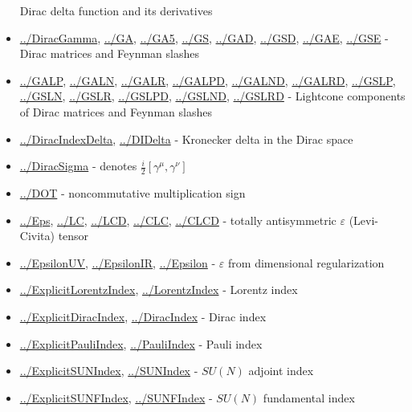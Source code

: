 \documentclass[../FeynCalcManual.tex]{subfiles}
\begin{document}
\begin{itemize}
  Dirac delta function and its derivatives
\item
  \hyperlink{../diracgamma}{../DiracGamma}, \hyperlink{../ga}{../GA},
  \hyperlink{../ga5}{../GA5}, \hyperlink{../gs}{../GS},
  \hyperlink{../gad}{../GAD}, \hyperlink{../gsd}{../GSD},
  \hyperlink{../gae}{../GAE}, \hyperlink{../gse}{../GSE} - Dirac
  matrices and Feynman slashes
\item
  \hyperlink{../galp}{../GALP}, \hyperlink{../galn}{../GALN},
  \hyperlink{../galr}{../GALR}, \hyperlink{../galpd}{../GALPD},
  \hyperlink{../galnd}{../GALND}, \hyperlink{../galrd}{../GALRD},
  \hyperlink{../gslp}{../GSLP}, \hyperlink{../gsln}{../GSLN},
  \hyperlink{../gslr}{../GSLR}, \hyperlink{../gslpd}{../GSLPD},
  \hyperlink{../gslnd}{../GSLND}, \hyperlink{../gslrd}{../GSLRD} -
  Lightcone components of Dirac matrices and Feynman slashes
\item
  \hyperlink{../diracindexdelta}{../DiracIndexDelta},
  \hyperlink{../didelta}{../DIDelta} - Kronecker delta in the Dirac
  space
\item
  \hyperlink{../diracsigma}{../DiracSigma} - denotes
  \(\frac{i}{2}[\gamma^\mu, \gamma^\nu]\)
\item
  \hyperlink{../dot}{../DOT} - noncommutative multiplication sign
\item
  \hyperlink{../eps}{../Eps}, \hyperlink{../lc}{../LC},
  \hyperlink{../lcd}{../LCD}, \hyperlink{../clc}{../CLC},
  \hyperlink{../clcd}{../CLCD} - totally antisymmetric \(\varepsilon\)
  (Levi-Civita) tensor
\item
  \hyperlink{../epsilonuv}{../EpsilonUV},
  \hyperlink{../epsilonir}{../EpsilonIR},
  \hyperlink{../epsilon}{../Epsilon} - \(\varepsilon\) from dimensional
  regularization
\item
  \hyperlink{../explicitlorentzindex}{../ExplicitLorentzIndex},
  \hyperlink{../lorentzindex}{../LorentzIndex} - Lorentz index
\item
  \hyperlink{../explicitdiracindex}{../ExplicitDiracIndex},
  \hyperlink{../diracindex}{../DiracIndex} - Dirac index
\item
  \hyperlink{../explicitpauliindex}{../ExplicitPauliIndex},
  \hyperlink{../pauliindex}{../PauliIndex} - Pauli index
\item
  \hyperlink{../explicitsunindex}{../ExplicitSUNIndex},
  \hyperlink{../sunindex}{../SUNIndex} - \(SU(N)\) adjoint index
\item
  \hyperlink{../explicitsunfindex}{../ExplicitSUNFIndex},
  \hyperlink{../sunfindex}{../SUNFIndex} - \(SU(N)\) fundamental index

\end{itemize}
\end{document}
